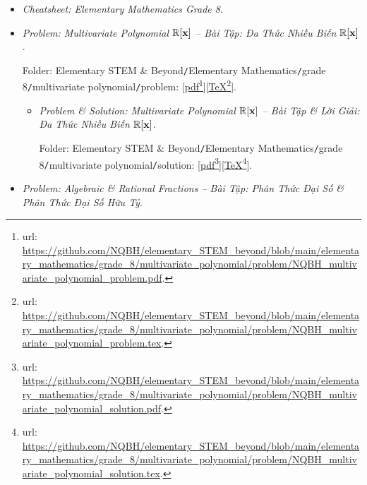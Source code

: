 \documentclass[12pt]{article}
\begin{document}
\begin{itemize}
	\item {\it Cheatsheet: Elementary Mathematics Grade 8}.
	\item {\it Problem: Multivariate Polynomial $\mathbb{R}[{\bf x}]$ -- Bài Tập: Đa Thức Nhiều Biến $\mathbb{R}[{\bf x}]$}.
	
	Folder: {\sf Elementary STEM \& Beyond{\tt/}Elementary Mathematics{\tt/}grade 8{\tt/}multivariate polynomial{\tt/}problem}: [\href{https://github.com/NQBH/elementary_STEM_beyond/blob/main/elementary_mathematics/grade_8/multivariate_polynomial/problem/NQBH_multivariate_polynomial_problem.pdf}{pdf}\footnote{{\sc url}: \url{https://github.com/NQBH/elementary_STEM_beyond/blob/main/elementary_mathematics/grade_8/multivariate_polynomial/problem/NQBH_multivariate_polynomial_problem.pdf}.}][\href{https://github.com/NQBH/elementary_STEM_beyond/blob/main/elementary_mathematics/grade_8/multivariate_polynomial/problem/NQBH_multivariate_polynomial_problem.tex}{\TeX}\footnote{{\sc url}: \url{https://github.com/NQBH/elementary_STEM_beyond/blob/main/elementary_mathematics/grade_8/multivariate_polynomial/problem/NQBH_multivariate_polynomial_problem.tex}.}].
	\begin{itemize}
		\item {\it Problem \& Solution: Multivariate Polynomial $\mathbb{R}[{\bf x}]$ -- Bài Tập \& Lời Giải: Đa Thức Nhiều Biến $\mathbb{R}[{\bf x}]$}.
		
		Folder: {\sf Elementary STEM \& Beyond{\tt/}Elementary Mathematics{\tt/}grade 8{\tt/}multivariate polynomial{\tt/}solution}: [\href{https://github.com/NQBH/elementary_STEM_beyond/blob/main/elementary_mathematics/grade_8/multivariate_polynomial/problem/NQBH_multivariate_polynomial_solution.pdf}{pdf}\footnote{{\sc url}: \url{https://github.com/NQBH/elementary_STEM_beyond/blob/main/elementary_mathematics/grade_8/multivariate_polynomial/problem/NQBH_multivariate_polynomial_solution.pdf}.}][\href{https://github.com/NQBH/elementary_STEM_beyond/blob/main/elementary_mathematics/grade_8/multivariate_polynomial/problem/NQBH_multivariate_polynomial_solution.tex}{\TeX}\footnote{{\sc url}: \url{https://github.com/NQBH/elementary_STEM_beyond/blob/main/elementary_mathematics/grade_8/multivariate_polynomial/problem/NQBH_multivariate_polynomial_solution.tex}.}].
	\end{itemize}
	\item {\it Problem: Algebraic \& Rational Fractions -- Bài Tập: Phân Thức Đại Số \& Phân Thức Đại Số Hữu Tỷ}.
	

\end{itemize}
\end{document}
